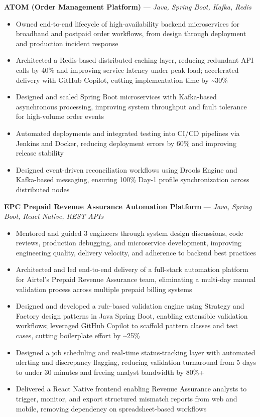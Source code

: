 \documentclass[10.5pt,letterpaper]{article}
\newcommand{\proj}[2]{\vspace{3pt}\textbf{#1} \hspace{0.3em}---\hspace{0.3em} \textit{#2}\par\vspace{-1pt}}
\newenvironment{bul}{\begin{itemize}[leftmargin=2.2em,itemsep=1pt,topsep=1pt,parsep=0pt,label=\textbullet]}{\end{itemize}}
\begin{document}
\proj{ATOM (Order Management Platform)}{Java, Spring Boot, Kafka, Redis}
\begin{bul}
\item Owned end-to-end lifecycle of high-availability backend microservices for broadband and postpaid order workflows, from design through deployment and production incident response
\item Architected a Redis-based distributed caching layer, reducing redundant API calls by 40\% and improving service latency under peak load; accelerated delivery with GitHub Copilot, cutting implementation time by \textasciitilde30\%
\item Designed and scaled Spring Boot microservices with Kafka-based asynchronous processing, improving system throughput and fault tolerance for high-volume order events
\item Automated deployments and integrated testing into CI/CD pipelines via Jenkins and Docker, reducing deployment errors by 60\% and improving release stability
\item Designed event-driven reconciliation workflows using Drools Engine and Kafka-based messaging, ensuring 100\% Day-1 profile synchronization across distributed nodes
\end{bul}

\proj{EPC Prepaid Revenue Assurance Automation Platform}{Java, Spring Boot, React Native, REST APIs}
\begin{bul}
\item Mentored and guided 3 engineers through system design discussions, code reviews, production debugging, and microservice development, improving engineering quality, delivery velocity, and adherence to backend best practices
\item Architected and led end-to-end delivery of a full-stack automation platform for Airtel's Prepaid Revenue Assurance team, eliminating a multi-day manual validation process across multiple prepaid billing systems
\item Designed and developed a rule-based validation engine using Strategy and Factory design patterns in Java Spring Boot, enabling extensible validation workflows; leveraged GitHub Copilot to scaffold pattern classes and test cases, cutting boilerplate effort by \textasciitilde25\%
\item Designed a job scheduling and real-time status-tracking layer with automated alerting and discrepancy flagging, reducing validation turnaround from 5 days to under 30 minutes and freeing analyst bandwidth by 80\%+
\item Delivered a React Native frontend enabling Revenue Assurance analysts to trigger, monitor, and export structured mismatch reports from web and mobile, removing dependency on spreadsheet-based workflows
\end{bul}
\end{document}
